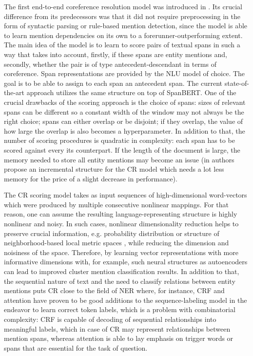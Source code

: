 The first end-to-end coreference resolution model was introduced in \cite{cr-Lee17}. Its crucial difference from its predecessors was that it did not require preprocessing in the form of syntactic parsing or rule-based mention detection, since the model is able to learn mention dependencies on its own to a forerunner-outperforming extent. 
The main idea of the model is to learn to score pairs of textual spans in such a way that takes into account, firstly, if these spans are entity mentions and, secondly, whether the pair is of type antecedent-descendant in terms of coreference.
Span representations are provided by the NLU model of choice. 
The goal is to be able to assign to each span an antecedent span. The current state-of-the-art approach \cite{cr-Joshi2019} utilizes the same structure on top of SpanBERT. One of the crucial drawbacks of the scoring approach is the choice of spans: sizes of relevant spans can be different so a constant width of the window may not always be the right choice; spans can either overlap or be disjoint; if they overlap, the value of how large the overlap is also becomes a hyperparameter. In addition to that, the number of scoring procedures is quadratic in complexity: each span has to be scored against every its counterpart. If the length of the document is large, the memory needed to store all entity mentions may become an issue (in \cite{cr-Xia2020} authors propose an incremental structure for the CR model which needs a lot less memory for the price of a slight decrease in performance).

The CR scoring model takes as input sequences of high-dimensional word-vectors which were produced by multiple consecutive nonlinear mappings. For that reason, one can assume the resulting language-representing structure is highly nonlinear and noisy. 
In such cases, nonlinear dimensionality reduction helps to preserve crucial information, e.g. probability distribution \cite{dr-VanderMaaten2014} or structure of neighborhood-based local metric spaces \cite{dr-McInnes2018}, while reducing the dimension and noisiness of the space. 
Therefore, by learning vector representations with more informative dimensions with, for example, such neural structures as autoencoders \cite{autoencoders-Zabalza2016,autoencoders-Sahay2019} can lead to improved cluster mention classification results. 
In addition to that, the sequential nature of text and the need to classify relations between entity mentions puts CR close to the field of NER where, for instance, CRF \cite{ner-Strakova2019,ner-Zhanming2019} and attention \cite{ner-Yamada2020,translation-Bahdanau2014} have proven to be good additions  to the sequence-labeling model in the endeavor to learn correct token labels, which is a problem with combinatorial complexity: CRF is capable of decoding of sequential relationships into meaningful labels, which in case of CR may represent relationships between mention spans, whereas attention is able to lay emphasis on trigger words or spans that are essential for the task of question.

